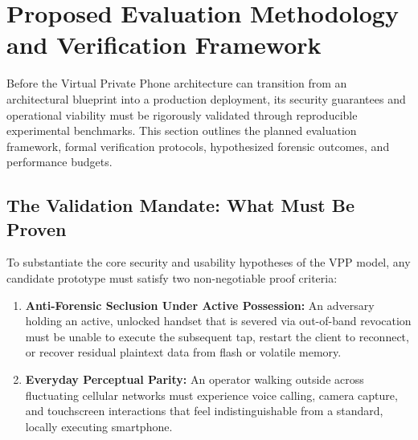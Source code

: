 \section{Proposed Evaluation Methodology and Verification Framework}
\label{sec:evaluation}

Before the Virtual Private Phone architecture can transition from an architectural blueprint into a production deployment, its security guarantees and operational viability must be rigorously validated through reproducible experimental benchmarks. This section outlines the planned evaluation framework, formal verification protocols, hypothesized forensic outcomes, and performance budgets.

\subsection{The Validation Mandate: What Must Be Proven}
To substantiate the core security and usability hypotheses of the VPP model, any candidate prototype must satisfy two non-negotiable proof criteria:
\begin{enumerate}
    \item \textbf{Anti-Forensic Seclusion Under Active Possession:} An adversary holding an active, unlocked handset that is severed via out-of-band revocation must be unable to execute the subsequent tap, restart the client to reconnect, or recover residual plaintext data from flash or volatile memory.
    \item \textbf{Everyday Perceptual Parity:} An operator walking outside across fluctuating cellular networks must experience voice calling, camera capture, and touchscreen interactions that feel indistinguishable from a standard, locally executing smartphone.
\end{enumerate}

